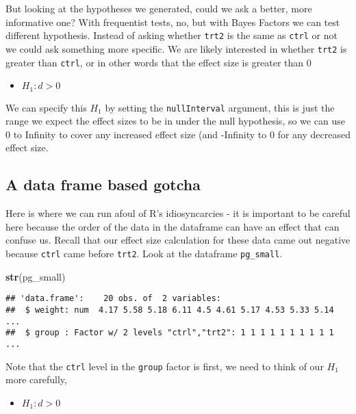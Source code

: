 \documentclass[
]{book}
\newenvironment{Shaded}{\begin{snugshade}}{\end{snugshade}}
\newcommand{\KeywordTok}[1]{\textcolor[rgb]{0.13,0.29,0.53}{\textbf{#1}}}
\newcommand{\NormalTok}[1]{#1}
\providecommand{\tightlist}{%
  \setlength{\itemsep}{0pt}\setlength{\parskip}{0pt}}
\begin{document}
But looking at the hypotheses we generated, could we ask a better, more informative one? With frequentist tests, no, but with Bayes Factors we can test different hypothesis. Instead of asking whether \texttt{trt2} is the same as \texttt{ctrl} or not we could ask something more specific. We are likely interested in whether \texttt{trt2} is greater than \texttt{ctrl}, or in other words that the effect size is greater than 0

\begin{itemize}
\tightlist
\item
  \(H_1 : d > 0\)
\end{itemize}

We can specify this \(H_1\) by setting the \texttt{nullInterval} argument, this is just the range we expect the effect sizes to be in under the null hypothesis, so we can use 0 to Infinity to cover any increased effect size (and -Infinity to 0 for any decreased effect size.

\hypertarget{a-data-frame-based-gotcha}{%
\subsection{A data frame based gotcha}\label{a-data-frame-based-gotcha}}

Here is where we can run afoul of R's idiosyncarcies - it is important to be careful here because the order of the data in the dataframe can have an effect that can confuse us. Recall that our effect size calculation for these data came out negative because \texttt{ctrl} came before \texttt{trt2}. Look at the dataframe \texttt{pg\_small}.

\begin{Shaded}
\begin{Highlighting}[]
\KeywordTok{str}\NormalTok{(pg_small)}
\end{Highlighting}
\end{Shaded}

\begin{verbatim}
## 'data.frame':    20 obs. of  2 variables:
##  $ weight: num  4.17 5.58 5.18 6.11 4.5 4.61 5.17 4.53 5.33 5.14 ...
##  $ group : Factor w/ 2 levels "ctrl","trt2": 1 1 1 1 1 1 1 1 1 1 ...
\end{verbatim}

Note that the \texttt{ctrl} level in the \texttt{group} factor is first, we need to think of our \(H_1\) more carefully,

\begin{itemize}
\tightlist
\item
  \(H_1 : d > 0\)
\end{itemize}
\end{document}
